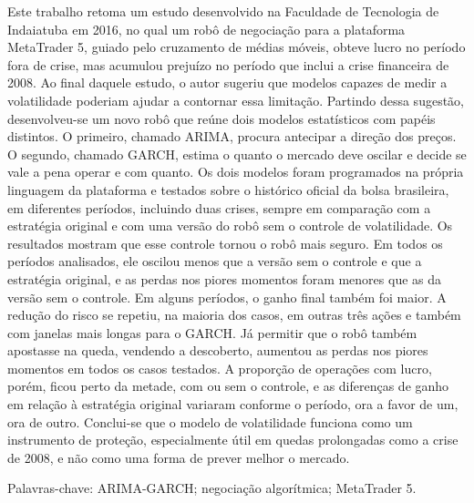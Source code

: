 \begin{resumo}
Este trabalho retoma um estudo desenvolvido na Faculdade de Tecnologia de
Indaiatuba em 2016, no qual um robô de negociação para a plataforma MetaTrader 5,
guiado pelo cruzamento de médias móveis, obteve lucro no período fora de crise,
mas acumulou prejuízo no período que inclui a crise financeira
de 2008. Ao final daquele estudo, o autor sugeriu que modelos capazes de medir a
volatilidade poderiam ajudar a contornar essa limitação. Partindo dessa sugestão,
desenvolveu-se um novo robô que reúne dois modelos estatísticos com papéis
distintos. O primeiro, chamado ARIMA, procura antecipar a direção dos preços. O
segundo, chamado GARCH, estima o quanto o mercado deve oscilar e decide se vale a
pena operar e com quanto. Os dois modelos foram programados na própria linguagem da plataforma
e testados sobre o histórico oficial
da bolsa brasileira, em diferentes períodos, incluindo duas crises, sempre em comparação com a
estratégia original e com uma versão do robô sem o controle de volatilidade. Os
resultados mostram que esse controle tornou o robô mais seguro. Em todos os
períodos analisados, ele oscilou menos que a versão sem o controle e que a
estratégia original, e as perdas nos piores momentos foram menores que as da
versão sem o controle. Em alguns períodos, o ganho final também foi maior.
A redução do risco se repetiu, na maioria dos casos, em outras três ações e
também com janelas mais longas para o GARCH. Já permitir que o robô também apostasse na queda, vendendo a
descoberto, aumentou as perdas nos piores momentos em todos os casos testados.
A proporção de operações com lucro, porém, ficou perto da metade, com ou sem o
controle, e
as diferenças de ganho em relação à estratégia original variaram conforme o
período, ora a favor
de um, ora de outro.
Conclui-se que o
modelo de volatilidade funciona como um instrumento de proteção, especialmente
útil em quedas prolongadas como a crise de 2008, e não como uma forma de prever
melhor o mercado.

\vspace{\onelineskip}
\noindent Palavras-chave: ARIMA-GARCH; negociação algorítmica; MetaTrader 5.
\end{resumo}
